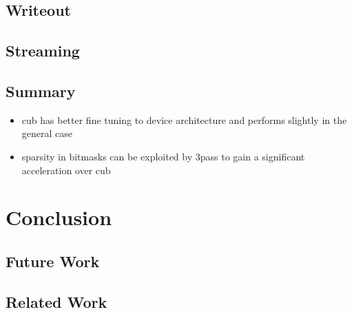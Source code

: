 \documentclass{tudscrreprt}
\begin{document}
		\section{Writeout}
		
		\section{Streaming}
		
		\section{Summary}
		
			\begin{itemize}
				\item cub has better fine tuning to device architecture and performs slightly in the general case
				\item sparsity in bitmasks can be exploited by 3pass to gain a significant acceleration over cub
			\end{itemize}
		
	\chapter{Conclusion}
	
		\section{Future Work}
	
		\section{Related Work}
	
\end{document}
